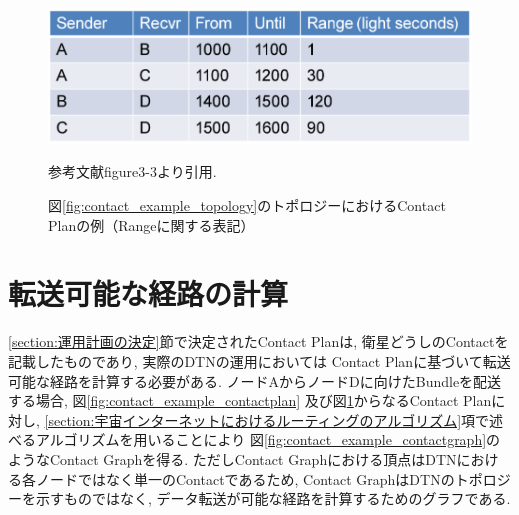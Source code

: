 \begin{figure}[tbh]
    \centering
    \includegraphics[width=0.5\textheight]{img/contact_example_contactrange.pdf}
    \caption{図\ref{fig:contact_example_topology}のトポロジーにおけるContact Planの例（Rangeに関する表記）}
    \label{fig:contact_example_contactrange}
    \begin{minipage}{\textwidth}
        \centering
        \vspace{3mm}
        参考文献\cite{schedule_aware_bundle_routing}figure3-3より引用.  
    \end{minipage}
\end{figure}


\section{転送可能な経路の計算}
\label{section:経路決定}

\ref{section:運用計画の決定}節で決定されたContact Planは, 
衛星どうしのContactを記載したものであり, 実際のDTNの運用においては
Contact Planに基づいて転送可能な経路を計算する必要がある.  
ノードAからノードDに向けたBundleを配送する場合, 
図\ref{fig:contact_example_contactplan}
及び図\ref{fig:contact_example_contactrange}からなるContact Planに対し, 
\ref{section:宇宙インターネットにおけるルーティングのアルゴリズム}項で述べるアルゴリズムを用いることにより
図\ref{fig:contact_example_contactgraph}のようなContact Graphを得る.  
ただしContact Graphにおける頂点はDTNにおける各ノードではなく単一のContactであるため, 
Contact GraphはDTNのトポロジーを示すものではなく, データ転送が可能な経路を計算するためのグラフである.  

